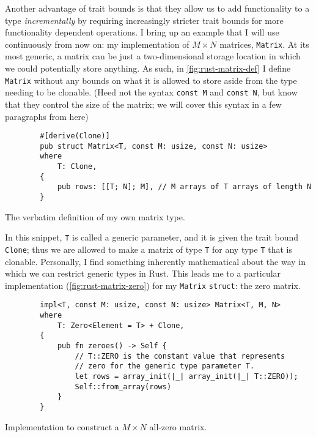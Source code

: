 \documentclass{report}
\newenvironment{code}{\captionsetup{type=listing}}{}
\begin{document}
Another advantage of trait bounds is that they allow us to add functionality to
a type \emph{incrementally} by requiring increasingly stricter trait bounds for
more functionality dependent operations. I bring up an example that I will use
continuously from now on: my implementation of $M\times N$ matrices,
\verb+Matrix+.
At its most generic, a matrix can be just a two-dimensional storage location
in which we could potentially store anything. As such, in
\cref{fig:rust-matrix-def} I define \texttt{Matrix} without any bounds on what
it is allowed to store aside from the type needing to be clonable.
(Heed not the syntax \texttt{const M} and \texttt{const N}, but know that they
control the size of the matrix; we will cover this syntax in a few paragraphs
from here)
\begin{code}
    \begin{verbatim}
        #[derive(Clone)]
        pub struct Matrix<T, const M: usize, const N: usize>
        where
            T: Clone,
        {
            pub rows: [[T; N]; M], // M arrays of T arrays of length N
        }
    \end{verbatim}
    \caption{The verbatim definition of my own matrix type.}
    \label{fig:rust-matrix-def}
\end{code}
\noindent
In this snippet, \texttt{T} is called a generic parameter, and it is given the
trait bound \texttt{Clone}; thus we are allowed to make a matrix of type \texttt{T}
for any type \texttt{T} that is clonable. Personally, I find something inherently
mathematical about the way in which we can restrict generic types in Rust. This
leads me to a particular implementation (\cref{fig:rust-matrix-zero}) for my
\texttt{Matrix} \texttt{struct}: the zero matrix.
\begin{code}
    \begin{verbatim}
        impl<T, const M: usize, const N: usize> Matrix<T, M, N>
        where
            T: Zero<Element = T> + Clone,
        {
            pub fn zeroes() -> Self {
                // T::ZERO is the constant value that represents
                // zero for the generic type parameter T.
                let rows = array_init(|_| array_init(|_| T::ZERO));
                Self::from_array(rows)
            }
        }
    \end{verbatim}
    \caption{Implementation to construct a $M\times N$ all-zero matrix.}
    \label{fig:rust-matrix-zero}
\end{code}
\end{document}
